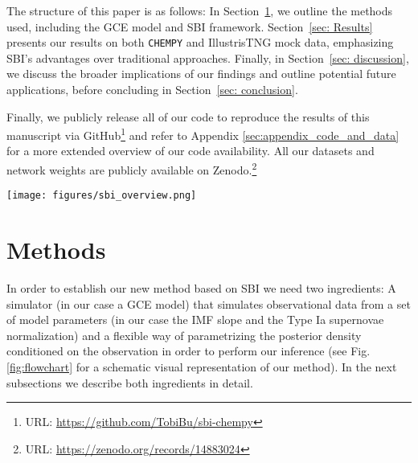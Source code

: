 \documentclass{aa}
\begin{document}
The structure of this paper is as follows: In Section~\ref{sec:methods}, we outline the methods used, including the GCE model and SBI framework. Section~\ref{sec: Results} presents our results on both \texttt{CHEMPY} and IllustrisTNG \citep{Pillepich2018} mock data, emphasizing SBI's advantages over traditional approaches. Finally, in Section~\ref{sec: discussion}, we discuss the broader implications of our findings and outline potential future applications, before concluding in Section~\ref{sec: conclusion}.

Finally, we publicly release all of our code to reproduce the results of this manuscript via GitHub\footnote{URL: {\url{https://github.com/TobiBu/sbi-chempy}}} and refer to Appendix \ref{sec:appendix_code_and_data} for a more extended overview of our code availability. All our datasets and network weights are publicly available on Zenodo.\footnote{URL: \url{https://zenodo.org/records/14883024}}

\begin{figure*}[]
     \centering
     \texttt{[image: figures/sbi\_overview.png]}
     \vspace{-.5cm}
     \caption{SBI flow chart. From a set of priors we simulate a sample of stellar abundances using \texttt{CHEMPY} \citep{Rybizki_2017,Philcox_2019} which we use to train a \emph{neural network} emulator to speed up the data generation process. Using the \emph{neural network} emulator we produce training data to train the Neural Density Estimator. With this we infer the posterior distribution of the model parameters from a single star. Repeating that for $N_{\rm stars}$ from the same galaxy gives an accurate fit of the IMF slope and Type Ia supernovae normalization.}
     \label{fig:flowchart}
\end{figure*}

\section{Methods}
\label{sec:methods}

In order to establish our new method based on SBI we need two ingredients: A simulator (in our case a GCE model) that simulates observational data from a set of model parameters (in our case the IMF slope and the Type Ia supernovae normalization) and a flexible way of parametrizing the posterior density conditioned on the observation in order to perform our inference (see Fig. \ref{fig:flowchart} for a schematic visual representation of our method). In the next subsections we describe both ingredients in detail.
\end{document}
